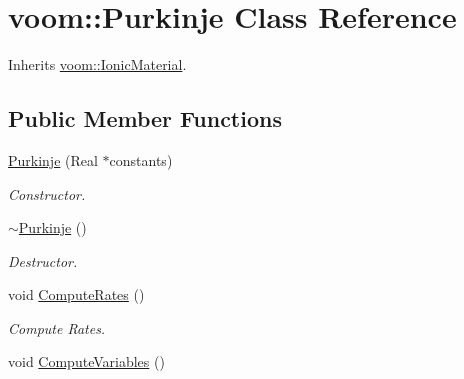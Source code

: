 \hypertarget{classvoom_1_1_purkinje}{
\section{voom::Purkinje Class Reference}
\label{classvoom_1_1_purkinje}
}


Inherits \hyperlink{classvoom_1_1_ionic_material}{voom::IonicMaterial}.\subsection*{Public Member Functions}
\begin{DoxyCompactItemize}
\item 
\hypertarget{classvoom_1_1_purkinje_a82edb2a8d3ef781d916baa683f344062}{
\hyperlink{classvoom_1_1_purkinje_a82edb2a8d3ef781d916baa683f344062}{Purkinje} (Real $\ast$constants)}
\label{classvoom_1_1_purkinje_a82edb2a8d3ef781d916baa683f344062}

\begin{DoxyCompactList}\small\item\em Constructor. \item\end{DoxyCompactList}\item 
\hypertarget{classvoom_1_1_purkinje_a618d55d5d8a897625e4dc263c9c0dc39}{
\hyperlink{classvoom_1_1_purkinje_a618d55d5d8a897625e4dc263c9c0dc39}{$\sim$Purkinje} ()}
\label{classvoom_1_1_purkinje_a618d55d5d8a897625e4dc263c9c0dc39}

\begin{DoxyCompactList}\small\item\em Destructor. \item\end{DoxyCompactList}\item 
void \hyperlink{classvoom_1_1_purkinje_aaa3d5d9632eaca5099d0568227faa958}{ComputeRates} ()
\begin{DoxyCompactList}\small\item\em Compute Rates. \item\end{DoxyCompactList}\item 
\hypertarget{classvoom_1_1_purkinje_a3250eb5c4e0e3eab7b434fbf0a251bc3}{
void \hyperlink{classvoom_1_1_purkinje_a3250eb5c4e0e3eab7b434fbf0a251bc3}{ComputeVariables} ()}
\label{classvoom_1_1_purkinje_a3250eb5c4e0e3eab7b434fbf0a251bc3}


\end{DoxyCompactItemize}
